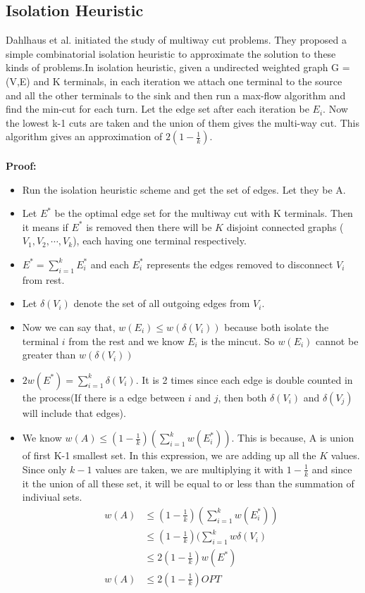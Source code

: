 \documentclass[11pt]{article}
\begin{document}
\subsection{Isolation Heuristic}
Dahlhaus et al.\cite{Dahlhaus} initiated the study of multiway cut problems. They proposed a simple combinatorial isolation heuristic to approximate the solution to these kinds of problems.In isolation heuristic, given a undirected weighted graph G = (V,E) and K terminals, in each iteration we attach one terminal to the source and all the other terminals to the sink and then run a max-flow algorithm and find the min-cut for each turn. Let the edge set after each iteration be $E_i$. Now the lowest k-1 cuts are taken and the union of them gives the multi-way cut. This algorithm gives an approximation of $2(1-\frac{1}{k})$.\\\\
\newpage
\textbf{Proof:}
\begin{itemize}
    \item Run the isolation heuristic scheme and get the set of edges. Let they be A.
    \item Let $E^*$ be the optimal edge set for the multiway cut with K terminals. Then it means if $E^*$ is removed then there will be $K$ disjoint connected graphs ($V_1, V_2,\cdots,V_k$), each having one terminal respectively.
    \item $E^* = \sum\limits_{i=1}^{k}{E_i^*}$ and each $E_i^*$ represents the edges removed to disconnect $V_i$ from rest.
    \item Let $\delta(V_i)$ denote the set of all outgoing edges from $V_i$.
    \item Now we can say that, $w(E_i) \le w(\delta(V_i))$ because both isolate the terminal $i$ from the rest and we know $E_i$ is the mincut. So $w(E_i)$ cannot be greater than $w(\delta(V_i))$
    \item $2w(E^*) = \sum\limits_{i=1}^{k}{\delta(V_i)} $. It is 2 times since each edge is double counted in the process(If there is a edge between $i$ and $j$, then both $\delta(V_i)$ and $\delta(V_j)$ will include that edges).
    \item We know $w(A) \le (1 -\frac{1}{k})(\sum\limits_{i=1}^k w(E_i^*))$. This is because, A is union of first K-1 smallest set. In this expression, we are adding up all the $K$ values. Since only $k-1$ values are taken, we are multiplying it with $1 - \frac{1}{k}$ and since it the union of all these set, it will be equal to or less than the summation of indiviual sets.
        \begin{align*}
            w(A) &\le (1 -\frac{1}{k})(\sum\limits_{i=1}^k w(E_i^*)) \\
            &\le (1 -\frac{1}{k})(\sum\limits_{i=1}^k w{\delta(V_i)}\\
            &\le 2(1 -\frac{1}{k})w(E^*)\\
          w(A)  &\le 2(1 -\frac{1}{k}) OPT
        \end{align*}
\end{itemize}
\end{document}
